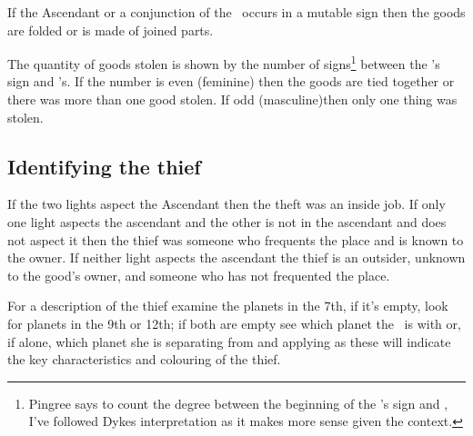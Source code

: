 If the Ascendant or a conjunction of the \Moon\, occurs in a mutable sign then the goods are folded or is made of joined parts.

The quantity of goods stolen is shown by the number of signs\footnote{Pingree says to count the degree between the beginning of the \Moon's sign and \Mercury, I've followed Dykes interpretation as it makes more sense given the context.} between the \Moon's sign and  \Mercury's.  If the number is even (feminine) then the goods are tied together or there was more than one good stolen. If odd (masculine)then only one thing was stolen.

\subsection{Identifying the thief}
If the two lights aspect the Ascendant then the theft was an inside job.  If only one light aspects the ascendant and the other is not in the ascendant and does not aspect it then the thief was someone  who frequents the place and is known to the owner. If neither light aspects the ascendant the thief is an outsider, unknown to the good's owner, and someone who has not frequented the place.

For a description of the thief examine the planets in the 7th, if it's empty, look for planets in the 9th or 12th; if both are empty see which planet the \Moon\, is with or, if alone, which planet she is separating from and applying as these will indicate the key characteristics and colouring of the thief.





